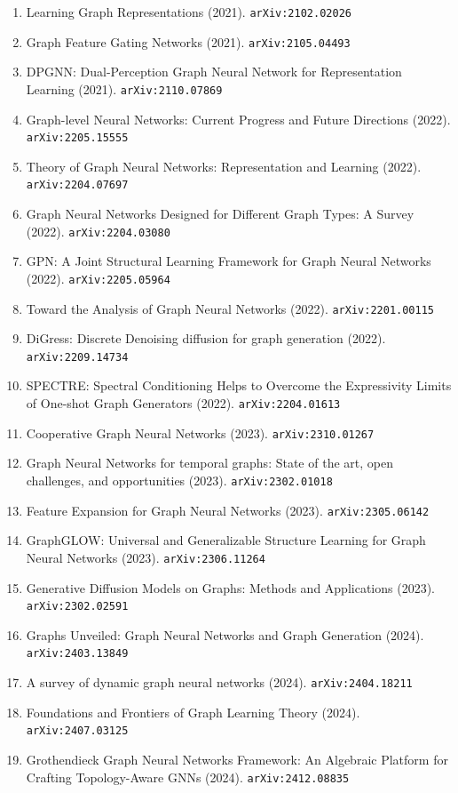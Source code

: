\documentclass[11pt]{article}
\begin{document}
\begin{enumerate}
  \item Learning Graph Representations (2021). \texttt{arXiv:2102.02026}
  \item Graph Feature Gating Networks (2021). \texttt{arXiv:2105.04493}
  \item DPGNN: Dual-Perception Graph Neural Network for Representation Learning (2021). \texttt{arXiv:2110.07869}
  \item Graph-level Neural Networks: Current Progress and Future Directions (2022). \texttt{arXiv:2205.15555}
  \item Theory of Graph Neural Networks: Representation and Learning (2022). \texttt{arXiv:2204.07697}
  \item Graph Neural Networks Designed for Different Graph Types: A Survey (2022). \texttt{arXiv:2204.03080}
  \item GPN: A Joint Structural Learning Framework for Graph Neural Networks (2022). \texttt{arXiv:2205.05964}
  \item Toward the Analysis of Graph Neural Networks (2022). \texttt{arXiv:2201.00115}
  \item DiGress: Discrete Denoising diffusion for graph generation (2022). \texttt{arXiv:2209.14734}
  \item SPECTRE: Spectral Conditioning Helps to Overcome the Expressivity Limits
  of One-shot Graph Generators (2022). \texttt{arXiv:2204.01613}
  \item Cooperative Graph Neural Networks (2023). \texttt{arXiv:2310.01267}
  \item Graph Neural Networks for temporal graphs: State of the art, open
  challenges, and opportunities (2023). \texttt{arXiv:2302.01018}
  \item Feature Expansion for Graph Neural Networks (2023). \texttt{arXiv:2305.06142}
  \item GraphGLOW: Universal and Generalizable Structure Learning for Graph
  Neural Networks (2023). \texttt{arXiv:2306.11264}
  \item Generative Diffusion Models on Graphs: Methods and Applications (2023). \texttt{arXiv:2302.02591}
  \item Graphs Unveiled: Graph Neural Networks and Graph Generation (2024). \texttt{arXiv:2403.13849}
  \item A survey of dynamic graph neural networks (2024). \texttt{arXiv:2404.18211}
  \item Foundations and Frontiers of Graph Learning Theory (2024). \texttt{arXiv:2407.03125}
  \item Grothendieck Graph Neural Networks Framework: An Algebraic Platform for Crafting Topology-Aware GNNs (2024). \texttt{arXiv:2412.08835}

\end{enumerate}
\end{document}
